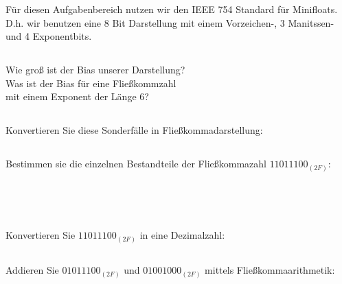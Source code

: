 Für diesen Aufgabenbereich nutzen wir den IEEE 754 Standard für Minifloats.\\
D.h. wir benutzen eine 8 Bit Darstellung mit einem Vorzeichen-,  3 Manitssen- und 4 Exponentbits.

\subsection{}
Wie groß ist der Bias unserer Darstellung?\\[0.3cm]
Was ist der Bias für eine Fließkommzahl\\[-0.2cm]mit einem Exponent der Länge 6? \\
\subsection{}
Konvertieren Sie diese Sonderfälle in Fließkommadarstellung:
\begin{center}
\end{center}
\subsection{}
Bestimmen sie die einzelnen Bestandteile der Fließkommazahl $11011100_{(2F)}$:
\begin{center}
	 \\[1ex]
	 \\[1ex]
\end{center}
\subsection{}
Konvertieren Sie $11011100_{(2F)}$ in eine Dezimalzahl:\\
\subsection{}
Addieren Sie $01011100_{(2F)}$ und $01001000_{(2F)}$ mittels Fließkommaarithmetik:\\
